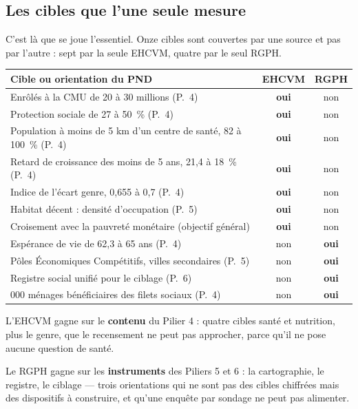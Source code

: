 \documentclass[11pt,a4paper]{article}
\begin{document}
\subsection{Les cibles que l'une seule mesure}

C'est là que se joue l'essentiel. Onze cibles sont couvertes par une source et pas par
l'autre : sept par la seule EHCVM, quatre par le seul RGPH.

\begin{center}
\small
\begin{tabular}{@{}>{\RaggedRight}p{7.4cm}cc@{}}
\toprule
\textbf{Cible ou orientation du PND} & \textbf{EHCVM} & \textbf{RGPH} \\
\midrule
Enrôlés à la CMU de 20 à 30 millions (P.~4) & \textbf{oui} & non \\
Protection sociale de 27 à 50~\% (P.~4) & \textbf{oui} & non \\
Population à moins de 5 km d'un centre de santé, 82 à 100~\% (P.~4) & \textbf{oui} & non \\
Retard de croissance des moins de 5 ans, 21,4 à 18~\% (P.~4) & \textbf{oui} & non \\
Indice de l'écart genre, 0,655 à 0,7 (P.~4) & \textbf{oui} & non \\
Habitat décent : densité d'occupation (P.~5) & \textbf{oui} & non \\
Croisement avec la pauvreté monétaire (objectif général) & \textbf{oui} & non \\
\addlinespace
Espérance de vie de 62,3 à 65 ans (P.~4) & non & \textbf{oui} \\
Pôles Économiques Compétitifs, villes secondaires (P.~5) & non & \textbf{oui} \\
Registre social unifié pour le ciblage (P.~6) & non & \textbf{oui} \\
827 000 ménages bénéficiaires des filets sociaux (P.~4) & non & \textbf{oui} \\
\bottomrule
\end{tabular}
\end{center}

\begin{retenir}[Lecture]
L'EHCVM gagne sur le \textbf{contenu} du Pilier 4 : quatre cibles santé et nutrition, plus le genre,
que le recensement ne peut pas approcher, parce qu'il ne pose aucune question de santé.

Le RGPH gagne sur les \textbf{instruments} des Piliers 5 et 6 : la cartographie, le registre, le
ciblage --- trois orientations qui ne sont pas des cibles chiffrées mais des dispositifs à
construire, et qu'une enquête par sondage ne peut pas alimenter.
\end{retenir}
\end{document}
